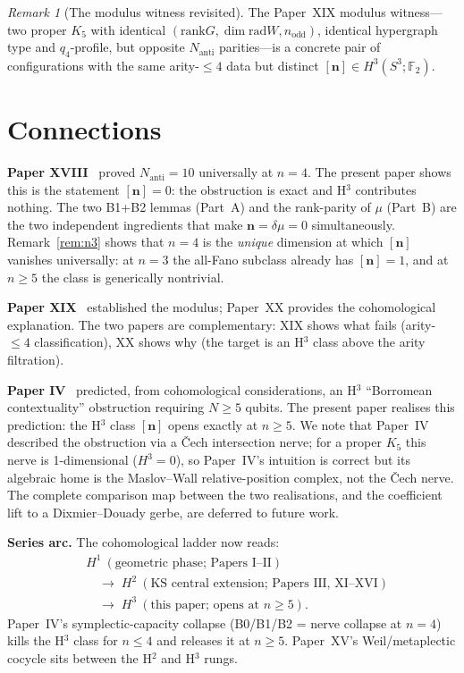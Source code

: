 \documentclass[11pt,a4paper]{article}
\theoremstyle{remark}
\newtheorem{remark}[theorem]{Remark}
\newcommand{\F}{\mathbb{F}}
\newcommand{\rad}{\mathrm{rad}}
\newcommand{\rank}{\mathrm{rank}}
\newcommand{\Nanti}{N_{\mathrm{anti}}}
\begin{document}
\begin{remark}[The modulus witness revisited]\label{rem:witness}
The Paper~XIX modulus witness---two proper $K_5$ with identical
$(\rank G,\dim\rad W,n_{\mathrm{odd}})$, identical hypergraph type and
$q_4$-profile, but opposite $\Nanti$ parities---is a concrete pair
of configurations with the same arity-$\le4$ data but distinct
$[\mathbf{n}]\in H^3(S^3;\F_2)$.
\end{remark}

\section{Connections}\label{sec:connections}

\textbf{Paper XVIII}~\cite{PaperXVIII} proved $\Nanti=10$ universally at $n=4$.
The present paper shows this is the statement $[\mathbf{n}]=0$: the obstruction
is exact and H$^3$ contributes nothing.  The two B1+B2 lemmas (Part~A) and the
rank-parity of $\mu$ (Part~B) are the two independent ingredients that make
$\mathbf{n}=\delta\mu=0$ simultaneously.  Remark~\ref{rem:n3} shows that $n=4$
is the \emph{unique} dimension at which $[\mathbf{n}]$ vanishes universally:
at $n=3$ the all-Fano subclass already has $[\mathbf{n}]=1$, and at $n\ge5$ the
class is generically nontrivial.

\textbf{Paper XIX}~\cite{PaperXIX} established the modulus; Paper~XX provides
the cohomological explanation.  The two papers are complementary: XIX shows
what fails (arity-$\le4$ classification), XX shows why (the target is an H$^3$
class above the arity filtration).

\textbf{Paper IV}~\cite{PaperIV} predicted, from cohomological considerations,
an H$^3$ ``Borromean contextuality'' obstruction requiring $N\ge5$ qubits.
The present paper realises this prediction: the H$^3$ class $[\mathbf{n}]$
opens exactly at $n\ge5$.  We note that Paper~IV described the obstruction
via a \v{C}ech intersection nerve; for a proper $K_5$ this nerve is
1-dimensional ($H^3=0$), so Paper~IV's intuition is correct but its algebraic
home is the Maslov--Wall relative-position complex, not the \v{C}ech nerve.
The complete comparison map between the two realisations, and the coefficient
lift to a Dixmier--Douady gerbe, are deferred to future work.

\textbf{Series arc.}
The cohomological ladder now reads:
\begin{align*}
  &H^1\ (\text{geometric phase; Papers I--II})\\
  &\quad\longrightarrow\;
   H^2\ (\text{KS central extension; Papers III, XI--XVI})\\
  &\quad\longrightarrow\;
   H^3\ (\text{this paper; opens at }n\ge5).
\end{align*}
Paper~IV's symplectic-capacity collapse (B0/B1/B2 = nerve collapse at $n=4$)
kills the H$^3$ class for $n\le4$ and releases it at $n\ge5$.
Paper~XV's Weil/metaplectic cocycle sits between the H$^2$ and H$^3$ rungs.
\end{document}
